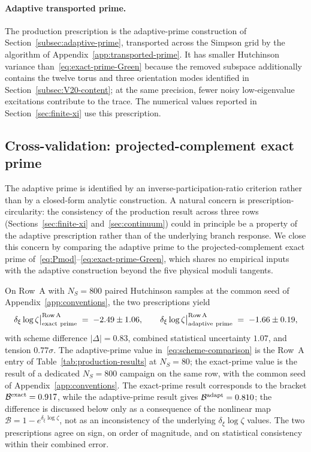 \documentclass[a4paper,11pt]{article}
\theoremstyle{definition}
\newcommand{\Bobs}{\mathcal{B}}
\begin{document}
\paragraph{Adaptive transported prime.}
The production prescription is the adaptive-prime construction of
Section~\ref{subsec:adaptive-prime}, transported across the Simpson grid
by the algorithm of Appendix~\ref{app:transported-prime}. It has
smaller Hutchinson variance than~\eqref{eq:exact-prime-Green}
because the removed subspace additionally contains the twelve torus
and three orientation modes identified in Section~\ref{subsec:V20-content};
at the same precision, fewer noisy low-eigenvalue excitations
contribute to the trace. The numerical values reported in
Section~\ref{sec:finite-xi} use this prescription.

\subsection{Cross-validation: projected-complement exact prime}
\label{subsec:cross-check-exact}

The adaptive prime is identified by an
inverse-participation-ratio criterion rather than by a closed-form
analytic construction. A natural concern is
prescription-circularity: the consistency of the production result
across three rows (Sections~\ref{sec:finite-xi}
and~\ref{sec:continuum}) could in principle be a property of the
adaptive prescription rather than of the underlying branch
response. We close this concern by comparing the adaptive prime to
the projected-complement exact prime
of~\eqref{eq:Pmod}--\eqref{eq:exact-prime-Green}, which shares no
empirical inputs with the adaptive construction beyond the five
physical moduli tangents.

On Row~A with $N_S = 800$ paired Hutchinson samples at the common
seed of Appendix~\ref{app:conventions}, the two prescriptions yield
\begin{equation}
\delta_\xi \log\zeta\bigr|_{\rm exact\ prime}^{\rm Row\,A}
\;=\; -2.49 \pm 1.06,
\qquad
\delta_\xi \log\zeta\bigr|_{\rm adaptive\ prime}^{\rm Row\,A}
\;=\; -1.66 \pm 0.19,
\label{eq:scheme-comparison}
\end{equation}
with scheme difference $|\Delta| = 0.83$, combined statistical
uncertainty $1.07$, and tension $0.77\sigma$. 
The adaptive-prime value in~\eqref{eq:scheme-comparison} is the
Row~A entry of Table~\ref{tab:production-results} at $N_S = 80$; the
exact-prime value is the result of a dedicated $N_S = 800$ campaign
on the same row, with the common seed of
Appendix~\ref{app:conventions}.
The exact-prime
result corresponds to the bracket $\Bobs^{\rm exact} = 0.917$,
while the adaptive-prime result gives
$\Bobs^{\rm adapt} = 0.810$; the difference is discussed below only
as a consequence of the nonlinear map
$\Bobs = 1 - e^{\delta_\xi \log\zeta}$, not as an inconsistency of
the underlying $\delta_\xi \log\zeta$ values. The two prescriptions
agree on sign, on order of magnitude, and on statistical
consistency within their combined error.
\end{document}
